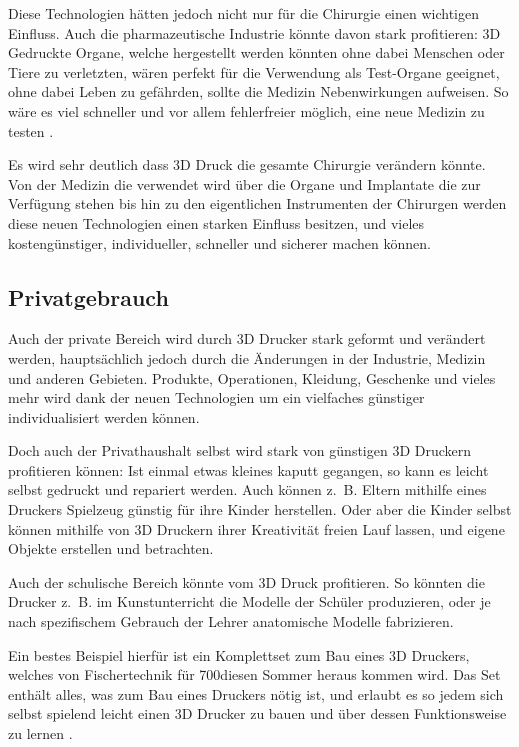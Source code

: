 Diese Technologien hätten jedoch nicht nur für die Chirurgie einen wichtigen Einfluss. Auch die pharmazeutische Industrie könnte davon stark profitieren: 3D Gedruckte Organe, welche hergestellt werden könnten ohne dabei Menschen oder Tiere zu verletzten, wären perfekt für die Verwendung als Test-Organe geeignet, ohne dabei Leben zu gefährden, sollte die Medizin Nebenwirkungen aufweisen. So wäre es viel schneller und vor allem fehlerfreier möglich, eine neue Medizin zu testen \parencite{ORGANOVO}. 

Es wird sehr deutlich dass 3D Druck die gesamte Chirurgie verändern könnte. Von der Medizin die verwendet wird über die Organe und Implantate die zur Verfügung stehen bis hin zu den eigentlichen Instrumenten der Chirurgen werden diese neuen Technologien einen starken Einfluss besitzen, und vieles kostengünstiger, individueller, schneller und sicherer machen können.

\newpage
\subsection{Privatgebrauch}

Auch der private Bereich wird durch 3D Drucker stark geformt und verändert werden, hauptsächlich jedoch durch die Änderungen in der Industrie, Medizin und anderen Gebieten. Produkte, Operationen, Kleidung, Geschenke und vieles mehr wird dank der neuen Technologien um ein vielfaches günstiger individualisiert werden können.

Doch auch der Privathaushalt selbst wird stark von günstigen 3D Druckern profitieren können: Ist einmal etwas kleines kaputt gegangen, so kann es leicht selbst gedruckt und repariert werden. Auch können z.~B. Eltern mithilfe eines Druckers Spielzeug günstig für ihre Kinder herstellen. Oder aber die Kinder selbst können mithilfe von 3D Druckern ihrer Kreativität freien Lauf lassen, und eigene Objekte erstellen und betrachten. 

Auch der schulische Bereich könnte vom 3D Druck profitieren. So könnten die Drucker z.~B. im Kunstunterricht die Modelle der Schüler produzieren, oder je nach spezifischem Gebrauch der Lehrer anatomische Modelle fabrizieren.

Ein bestes Beispiel hierfür ist ein Komplettset zum Bau eines 3D Druckers, welches von Fischertechnik für 700\EURO diesen Sommer heraus kommen wird. Das Set enthält alles, was zum Bau eines Druckers nötig ist, und erlaubt es so jedem sich selbst spielend leicht einen 3D Drucker zu bauen und über dessen Funktionsweise zu lernen \parencite{FISCHERTECHNIK}.

